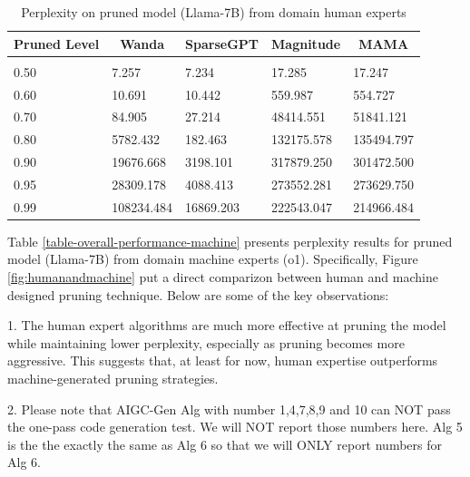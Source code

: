 \documentclass{article} %
\begin{document}
\begin{table}[t]
\caption{Perplexity on pruned model (Llama-7B) from domain human experts}
\label{table-overall-performance-human}
\begin{center}
\begin{tabular}{lllll}
\multicolumn{1}{c}{\bf Pruned Level}  &\multicolumn{1}{c}{\bf Wanda} &\multicolumn{1}{c}{\bf SparseGPT} &\multicolumn{1}{c}{\bf Magnitude} &\multicolumn{1}{c}{\bf MAMA}
\\ \hline \\
0.50         &7.257 &7.234	& 17.285 & 17.247 \\
0.60         &10.691 &10.442 & 559.987 & 554.727 \\
0.70         &84.905 &27.214 & 48414.551 & 51841.121 \\
0.80         &5782.432 &182.463 & 132175.578 & 135494.797 \\
0.90         &19676.668 &3198.101 & 317879.250 & 301472.500 \\
0.95         &28309.178 &4088.413 & 273552.281 & 273629.750 \\
0.99         &108234.484 &16869.203 & 222543.047 & 214966.484 \\
\end{tabular}
\end{center}
\end{table}

Table \ref{table-overall-performance-machine} presents perplexity results for pruned model (Llama-7B) from domain machine experts (o1). Specifically, Figure \ref{fig:humanandmachine} put a direct comparizon between human and machine designed pruning technique. Below are some of the key observations:

1. The human expert algorithms are much more effective at pruning the model while maintaining lower perplexity, especially as pruning becomes more aggressive. This suggests that, at least for now, human expertise outperforms machine-generated pruning strategies.

2. Please note that AIGC-Gen Alg with number 1,4,7,8,9 and 10 can NOT pass the one-pass code generation test. We will NOT report those numbers here. Alg 5 is the the exactly the same as Alg 6 so that we will ONLY report numbers for Alg 6.
\end{document}
